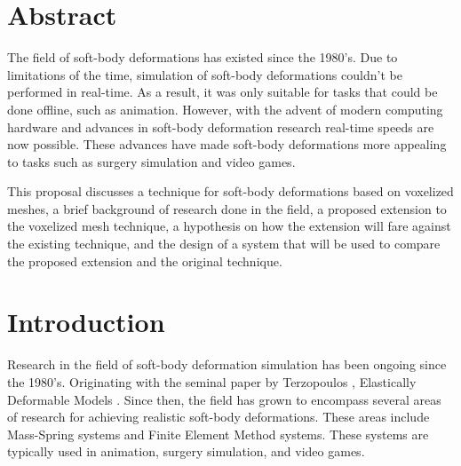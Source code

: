 \section*{Abstract}

The field of soft-body deformations has existed since the 1980's. Due to limitations of the time,
simulation of soft-body deformations couldn't be performed in real-time. As a result, it was only 
suitable for tasks that could be done offline, such as animation. However, with the advent of 
modern computing hardware and advances in soft-body deformation research real-time speeds are now
possible. These advances have made soft-body deformations more appealing to tasks such as surgery 
simulation and video games.

This proposal discusses a technique for soft-body deformations based on voxelized meshes, a brief
background of research done in the field, a proposed extension to the voxelized mesh technique, a 
hypothesis on how the extension will fare against the existing technique, and the design of a system
that will be used to compare the proposed extension and the original technique.

\vfill{}

\setcounter{page}{0} 
\newpage{}

\section{Introduction}

Research in the field of soft-body deformation simulation has been ongoing since the 1980's. 
Originating with the seminal paper by Terzopoulos \etal, Elastically Deformable Models 
\cite{Elastically-Deformable-Models}. Since then, the field has 
grown to encompass several areas of research for achieving realistic soft-body deformations. These
areas include Mass-Spring systems and Finite Element Method systems. 
These systems are typically
used in animation, surgery simulation, and video games.

